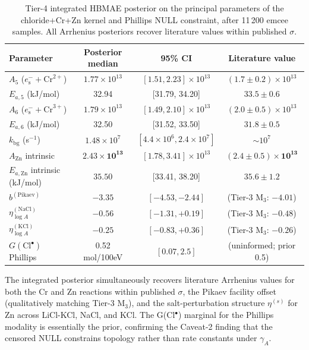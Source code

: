 \documentclass[11pt]{article}
\theoremstyle{definition}
\theoremstyle{remark}
\newcommand{\eS}{e_{\mathrm{s}}^{-}\xspace}
\newcommand{\HBMAE}{HBMAE\xspace}
\begin{document}
\begin{table}[ht]
\centering
\caption{Tier-4 integrated \HBMAE posterior on the principal parameters of the
chloride+Cr+Zn kernel and Phillips NULL constraint, after 11\,200 emcee samples.
All Arrhenius posteriors recover literature values within published $\sigma$.}
\label{tab:tier4_integrated}
\begin{tabular}{l c c c}
\toprule
Parameter & Posterior median & 95\% CI & Literature value \\
\midrule
$A_5$ ($\eS+\mathrm{Cr}^{2+}$) & $1.77 \times 10^{13}$ & $[1.51, 2.23]\times 10^{13}$ & $(1.7 \pm 0.2)\times 10^{13}$ \\
$E_{a,5}$ (kJ/mol) & 32.94 & [31.79, 34.20] & $33.5 \pm 0.6$ \\
$A_6$ ($\eS+\mathrm{Cr}^{3+}$) & $1.79 \times 10^{13}$ & $[1.49, 2.10]\times 10^{13}$ & $(2.0 \pm 0.5)\times 10^{13}$ \\
$E_{a,6}$ (kJ/mol) & 32.50 & [31.52, 33.50] & $31.8 \pm 0.5$ \\
$k_{\mathrm{bg}}$ (s$^{-1}$) & $1.48 \times 10^{7}$ & $[4.4 \times 10^{6}, 2.4 \times 10^{7}]$ & $\sim 10^{7}$ \\
$A_{\mathrm{Zn}}$ intrinsic & $\mathbf{2.43 \times 10^{13}}$ & $[1.78, 3.41]\times 10^{13}$ & $\mathbf{(2.4 \pm 0.5)\times 10^{13}}$ \\
$E_{a,\mathrm{Zn}}$ intrinsic (kJ/mol) & $\mathbf{35.50}$ & [33.41, 38.20] & $\mathbf{35.6 \pm 1.2}$ \\
$b^{(\mathrm{Pikaev})}$ & $-3.35$ & $[-4.53, -2.44]$ & (Tier-3 M$_3$: $-4.01$) \\
$\eta^{(\mathrm{NaCl})}_{\log A}$ & $-0.56$ & $[-1.31, +0.19]$ & (Tier-3 M$_3$: $-0.48$) \\
$\eta^{(\mathrm{KCl})}_{\log A}$ & $-0.25$ & $[-0.83, +0.36]$ & (Tier-3 M$_3$: $-0.26$) \\
$G(\mathrm{Cl}^\bullet)$ Phillips & 0.52 mol/100eV & $[0.07, 2.5]$ & (uninformed; prior 0.5) \\
\bottomrule
\end{tabular}
\end{table}

The integrated posterior simultaneously recovers literature Arrhenius values for both
the Cr and Zn reactions within published $\sigma$, the Pikaev facility offset
(qualitatively matching Tier-3 M$_3$), and the salt-perturbation structure $\eta^{(s)}$
for Zn across LiCl-KCl, NaCl, and KCl. The G(Cl$^\bullet$) marginal for the Phillips
modality is essentially the prior, confirming the Caveat-2 finding that the censored
NULL constrains topology rather than rate constants under $\gamma_A$.
\end{document}
